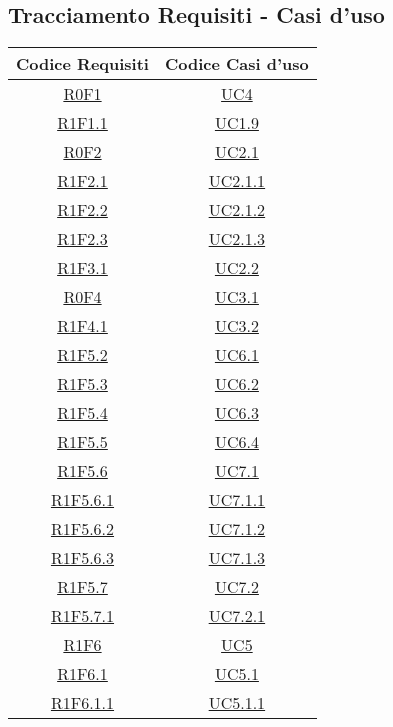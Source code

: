 \subsection{Tracciamento Requisiti - Casi d'uso}
\normalsize
\begin{longtable}{|c|c|}
	\hline
\textbf{Codice Requisiti} & \textbf{Codice Casi d'uso} \\
\hline
\endhead
\hyperlink{R0F1}{R0F1} & \hyperlink{UC4}{UC4}\\
\hline
\hyperlink{R1F1.1}{R1F1.1} & \hyperlink{UC1.9}{UC1.9}\\
\hline
\hyperlink{R0F2}{R0F2} & \hyperlink{UC2.1}{UC2.1}\\
\hline
\hyperlink{R1F2.1}{R1F2.1} & \hyperlink{UC2.1.1}{UC2.1.1}\\
\hline
\hyperlink{R1F2.2}{R1F2.2} & \hyperlink{UC2.1.2}{UC2.1.2}\\
\hline
\hyperlink{R1F2.3}{R1F2.3} & \hyperlink{UC2.1.3}{UC2.1.3}\\
\hline
\hyperlink{R1F3.1}{R1F3.1} & \hyperlink{UC2.2}{UC2.2}\\
\hline
\hyperlink{R0F4}{R0F4} & \hyperlink{UC3.1}{UC3.1}\\
\hline
\hyperlink{R1F4.1}{R1F4.1} & \hyperlink{UC3.2}{UC3.2}\\
\hline
\hyperlink{R1F5.2}{R1F5.2} & \hyperlink{UC6.1}{UC6.1}\\
\hline
\hyperlink{R1F5.3}{R1F5.3} & \hyperlink{UC6.2}{UC6.2}\\
\hline
\hyperlink{R1F5.4}{R1F5.4} & \hyperlink{UC6.3}{UC6.3}\\
\hline
\hyperlink{R1F5.5}{R1F5.5} & \hyperlink{UC6.4}{UC6.4}\\
\hline
\hyperlink{R1F5.6}{R1F5.6} & \hyperlink{UC7.1}{UC7.1}\\
\hline
\hyperlink{R1F5.6.1}{R1F5.6.1} & \hyperlink{UC7.1.1}{UC7.1.1}\\
\hline
\hyperlink{R1F5.6.2}{R1F5.6.2} & \hyperlink{UC7.1.2}{UC7.1.2}\\
\hline
\hyperlink{R1F5.6.3}{R1F5.6.3} & \hyperlink{UC7.1.3}{UC7.1.3}\\
\hline
\hyperlink{R1F5.7}{R1F5.7} & \hyperlink{UC7.2}{UC7.2}\\
\hline
\hyperlink{R1F5.7.1}{R1F5.7.1} & \hyperlink{UC7.2.1}{UC7.2.1}\\
\hline
\hyperlink{R1F6}{R1F6} & \hyperlink{UC5}{UC5}\\
\hline
\hyperlink{R1F6.1}{R1F6.1} & \hyperlink{UC5.1}{UC5.1}\\
\hline
\hyperlink{R1F6.1.1}{R1F6.1.1} & \hyperlink{UC5.1.1}{UC5.1.1}\\

\end{longtable}
